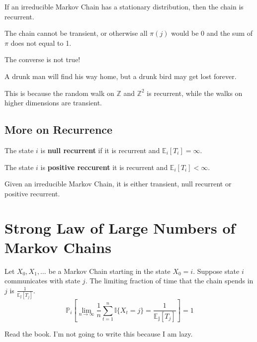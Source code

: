 \begin{corollary}
    If an irreducible Markov Chain has a stationary distribution, then the chain is recurrent.
\end{corollary}
\begin{sketchproof}
    The chain cannot be transient, or otherwise all $\pi(j)$ would be 0 and the sum of $\pi$ does not equal to 1.
\end{sketchproof}
\begin{remark}
    The converse is not true!
\end{remark}

\begin{proposition}
    A drunk man will find his way home, but a drunk bird may get lost forever.
\end{proposition}
This is because the random walk on $\mathbb{Z}$ and $\mathbb{Z}^2$ is recurrent, while the walks on higher dimensions are transient.

\subsection{More on Recurrence}
\begin{definition}
    The state $i$ is \textbf{null recurrent} if it is recurrent and $\mathbb{E}_i[T_i] = \infty$.
\end{definition}
\begin{definition}
    The state $i$ is \textbf{positive reccurent} it is recurrent and $\mathbb{E}_i[T_i] < \infty$.
\end{definition}

\begin{proposition}
    Given an irreducible Markov Chain, it is either transient, null recurrent or positive recurrent.
\end{proposition}

\section{Strong Law of Large Numbers of Markov Chains}
\begin{theorem}\label{SLLN}
    Let $X_0, X_1, \dots$ be a Markov Chain starting in the state $X_0=i$. Suppose state $i$ communicates with state $j$. The limiting fraction of time that the chain spends in $j$ is $\frac{1}{\mathbb{E_j}[T_j]}$.
    \[ \mathbb{P}_i[\lim_{n\to\infty}\frac{1}{n}\sum_{t=1}^n\mathbb{I}\{X_t=j\} = \frac{1}{\mathbb{E_j}[T_j]}] = 1 \]
\end{theorem}
\begin{sketchproof}
    Read the book. I'm not going to write this because I am lazy.
\end{sketchproof}


